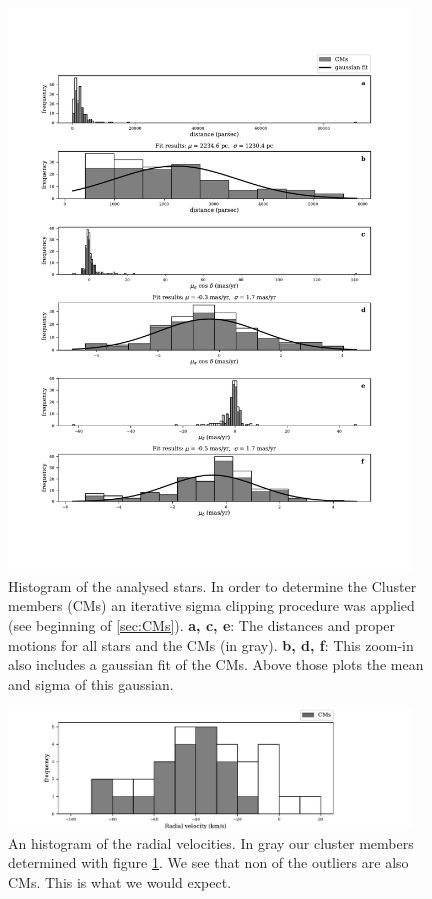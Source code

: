 \documentclass{article}
\begin{document}
\begin{figure}[H]
  \centering
    \includegraphics[trim={0 3.4cm 0 2.9cm},clip,width=0.95\textwidth]{Teutsch55_histogram_all.pdf}
  \caption{Histogram of the analysed stars. In order to determine the Cluster members (CMs) an iterative sigma clipping procedure was applied (see beginning of \ref{sec:CMs}). \textbf{a, c, e}: The distances and proper motions for all stars and the CMs (in gray). \textbf{b, d, f}: This zoom-in also includes a gaussian fit of the CMs. Above those plots the mean and sigma of this gaussian.}
  \label{fig:Teutsch55_histogram_all}
\end{figure}

\begin{figure}[H]
  \centering
    \includegraphics[trim={0 0 2cm 0},clip,width=0.95\textwidth]{Teutsch55_histogram_RV.pdf}
  \caption{An histogram of the radial velocities. In gray our cluster members determined with figure \ref{fig:Teutsch55_histogram_all}. We see that non of the outliers are also CMs. This is what we would expect.}
  \label{fig:Teutsch55_histogram_RV}
\end{figure}
\end{document}
